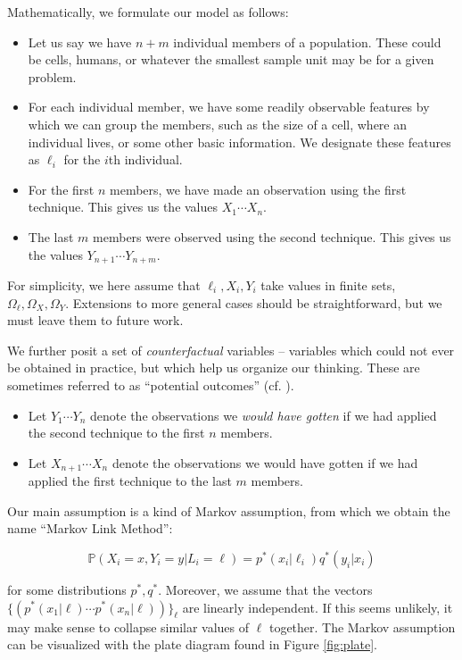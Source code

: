 Mathematically, we formulate our model as follows:

\begin{itemize}
\item Let us say we have $n+m$ individual members of a population.  These could be cells, humans, or whatever the smallest sample unit may be for a given problem.
\item For each individual member, we have some readily observable features by which we can group the members, such as the size of a cell, where an individual lives, or some other basic information.  We designate these features as $\ell_i$ for the $i$th individual.
\item For the first $n$ members, we have made an observation using the first technique.  This gives us the values $X_1 \cdots X_n$.
\item The last $m$ members were observed using the second technique.  This gives us the values $Y_{n+1} \cdots Y_{n+m}$.
\end{itemize}

For simplicity, we here assume that $\ell_i,X_i,Y_i$ take values in finite sets, $\Omega_\ell,\Omega_X,\Omega_Y$.  Extensions to more general cases should be straightforward, but we must leave them to future work.  

We further posit a set of \emph{counterfactual} variables -- variables which could not ever be obtained in practice, but which help us organize our thinking.  These are sometimes referred to as ``potential outcomes''  (cf. \cite{rubin2005causal}).

\begin{itemize}
\item Let $Y_1 \cdots Y_n$ denote the observations we \emph{would have gotten} if we had applied the second technique to the first $n$ members.
\item Let $X_{n+1} \cdots X_n$ denote the observations we would have gotten if we had applied the first technique to the last $m$ members. 
\end{itemize}

Our main assumption is a kind of Markov assumption, from which we obtain the name ``Markov Link Method'':

\begin{equation}\label{eq:mainassumption}
\mathbb{P}(X_i=x,Y_i=y|L_i=\ell)=p^*(x_i|\ell_i)q^*(y_i|x_i)
\end{equation}

for some distributions $p^*,q^*$.  Moreover, we assume that the vectors $\{(p^*(x_1|\ell)\cdots p^*(x_n|\ell))\}_\ell$ are linearly independent.  If this seems unlikely, it may make sense to collapse similar values of $\ell$ together.  The Markov assumption can be visualized with the plate diagram found in Figure \ref{fig:plate}.

